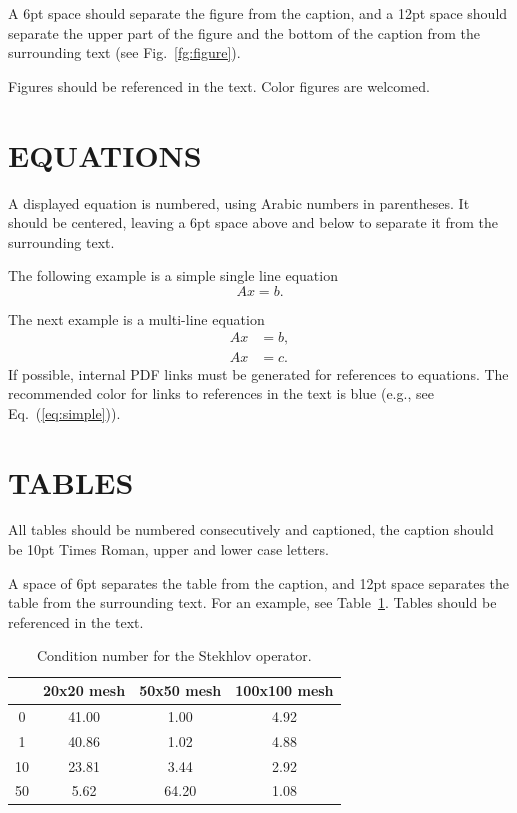 \documentclass[oneside,a4paper,english,links]{amca}
\begin{document}
A 6pt space should separate the figure from the caption, and a
12pt space should separate the upper part of the figure and the
bottom of the caption from the surrounding text (see
Fig.~\ref{fg:figure}).

Figures should be referenced in the text. Color figures are welcomed.

\section{EQUATIONS}

A displayed equation is numbered, using Arabic numbers in parentheses.
It should be  centered, leaving a 6pt space above and below to separate it from
the surrounding text.

The following example is a simple single line
equation
%
\begin{equation}
Ax = b.
\end{equation}

The next example is a multi-line equation
%
\begin{equation} \label{eq:simple}  
\begin{aligned}
Ax& = b,\\
Ax& = c.
\end{aligned}
\end{equation}
%
If possible, internal PDF links must be generated for references to
equations. The recommended color for links to references in the text
is blue (e.g., see Eq.~(\ref{eq:simple})).

\section{TABLES}

All tables should be numbered consecutively and captioned, the caption
should be 10pt Times Roman, upper and lower case letters.

A space of 6pt separates the table from the caption, and 12pt space
separates the table from the surrounding text. For an example, see
Table~\ref{tab:n50}. Tables should be referenced in the text.

\begin{table}[htb]
\centering
\begin{tabular}{|c|c|c|c|}
\hline  & 20x20 mesh & 50x50 mesh & 100x100 mesh\\
\hline
\hline
 0 & 41.00 & 1.00 & 4.92\\
\hline
 1 & 40.86 & 1.02 & 4.88 \\
\hline
10 & 23.81 & 3.44 & 2.92 \\
\hline
50 & 5.62 & 64.20 & 1.08 \\
\hline
\end{tabular}
\caption{Condition number for the Stekhlov operator. }
\label{tab:n50}
\end{table}
\end{document}
